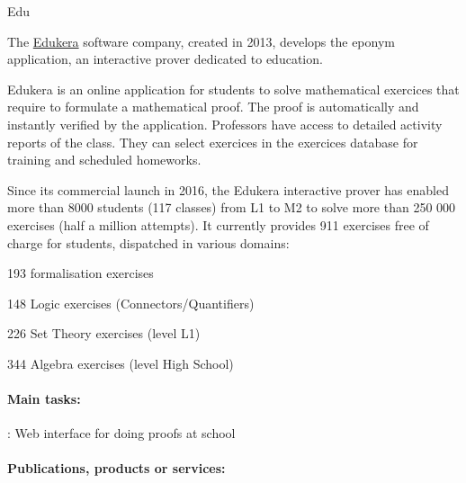 \begin{sitedescription}{Edu}



The \hyperlink{https://www.edukera.com}{Edukera} software company, created in 2013,
develops the eponym application, an interactive prover dedicated to education.

Edukera is an online application for students to solve mathematical exercices that require to
formulate a mathematical proof. The proof is automatically and instantly verified by the application. Professors
have access to detailed activity reports of the class. They can select exercices in the exercices database
for training and scheduled homeworks.

Since its commercial launch in 2016, the Edukera interactive prover has enabled more than 8000 students
(117 classes) from L1 to M2 to solve more than 250 000 exercises (half a million attempts). It currently
provides 911 exercises free of charge for students, dispatched in various domains:
\begin{compactitem}
\item 193 formalisation exercises
\item 148 Logic exercises (Connectors/Quantifiers)
\item 226 Set Theory exercises (level L1)
\item 344 Algebra exercises (level High School)
\end{compactitem}

\paragraph{Main tasks:}


\begin{compactitem}
\item {} : Web interface for doing proofs at school
\end{compactitem}

\paragraph{Publications, products or services:}



\end{sitedescription}
